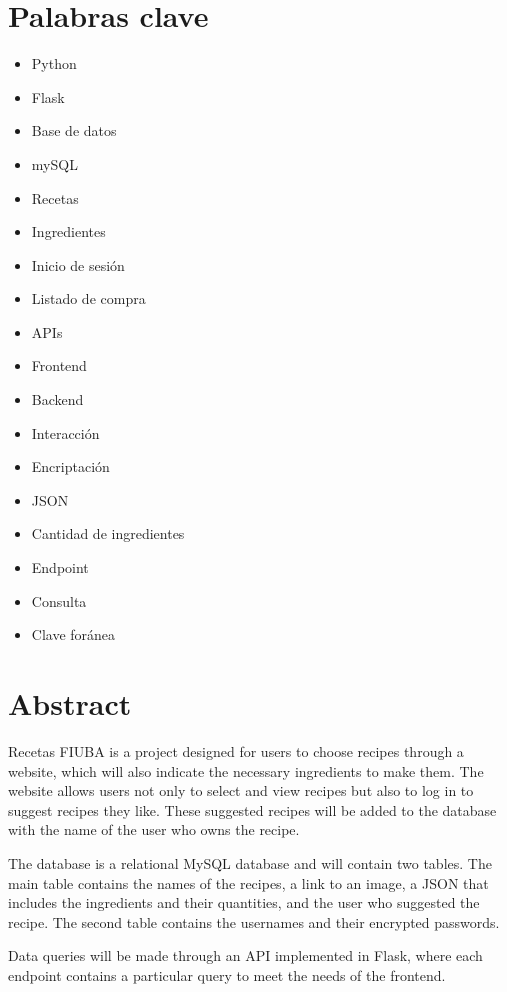 \documentclass[a4paper,11pt]{article}
\begin{document}
\section*{Palabras clave}
\begin{multicols}{2}
\begin{itemize}
    \item Python
    \item Flask
    \item Base de datos
    \item mySQL
    \item Recetas
    \item Ingredientes
    \item Inicio de sesión
    \item Listado de compra
    \item APIs
    \item Frontend
    \item Backend
    \item Interacción
    \item Encriptación
    \item JSON
    \item Cantidad de ingredientes
    \item Endpoint
    \item Consulta
    \item Clave foránea
\end{itemize}
\end{multicols}

\section*{Abstract}
Recetas FIUBA is a project designed for users to choose recipes through a website, which will also indicate the necessary ingredients to make them. The website allows users not only to select and view recipes but also to log in to suggest recipes they like. These suggested recipes will be added to the database with the name of the user who owns the recipe.

The database is a relational MySQL database and will contain two tables. The main table contains the names of the recipes, a link to an image, a JSON that includes the ingredients and their quantities, and the user who suggested the recipe. The second table contains the usernames and their encrypted passwords.

Data queries will be made through an API implemented in Flask, where each endpoint contains a particular query to meet the needs of the frontend.
\end{document}
